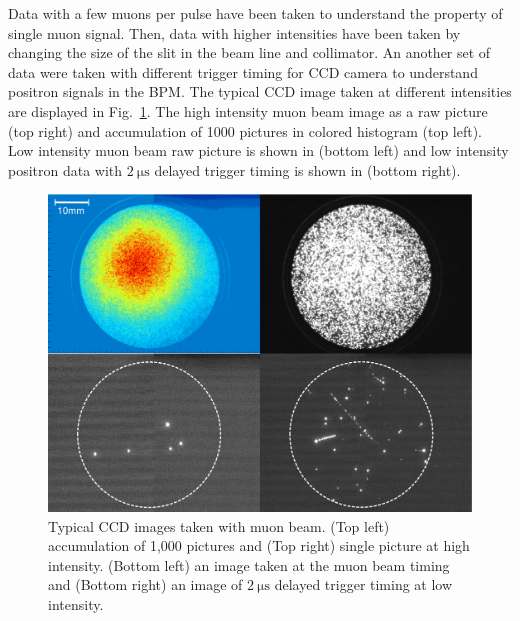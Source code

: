\documentclass[preprint,3p,twocolumn]{elsarticle}
\begin{document}
Data with a few muons per pulse have been taken to understand the property of single muon signal.
Then, data with higher intensities have been taken by changing the size of the slit in the beam line and collimator. 
An another set of data were taken with different trigger timing for CCD camera to understand positron signals in the BPM. %
The typical CCD image taken at different intensities are displayed in Fig.~\ref{fig:single_cluster}. The high intensity muon beam image as a raw picture (top right) and accumulation of 1000 pictures in colored histogram (top left). Low intensity muon beam raw picture is shown in (bottom left) and low intensity positron data with $\SI{2}{\micro\s}$ delayed trigger timing is shown in (bottom right).
\begin{figure}[tbp]
	\centering
	\includegraphics[width=\columnwidth]{figure/fig3_v2.pdf}
	\caption{Typical CCD images taken with muon beam. (Top left) accumulation of 1,000 pictures and (Top right) single picture at high intensity.  (Bottom left) an image taken at the muon beam timing and (Bottom right) an image of $\SI{2}{\micro\s}$ delayed trigger timing at low intensity.
	}
	\vspace{-0.4cm}
	\label{fig:single_cluster}
\end{figure}
\end{document}
